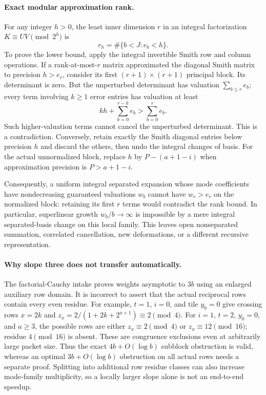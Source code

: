 \paragraph{Exact modular approximation rank.}
For any integer $h>0$, the least inner dimension $r$ in an integral
factorization $K\equiv UV\pmod {2^h}$ is
\[
 r_h=\#\{b<J:e_b<h\}.
\]
To prove the lower bound, apply the integral invertible Smith row
and column operations. If a rank-at-most-$r$ matrix approximated the
diagonal Smith matrix to precision $h>e_r$, consider its first
$(r+1)\times(r+1)$ principal block. Its determinant is zero. But the
unperturbed determinant has valuation $\sum_{b\le r}e_b$; every
term involving $k\ge1$ error entries has valuation at least
\[
 kh+\sum_{b=0}^{r-k}e_b
 >\sum_{b=0}^{r}e_b.
\]
Such higher-valuation terms cannot cancel the unperturbed determinant.
This is a contradiction. Conversely, retain exactly the Smith diagonal
entries below precision $h$ and discard the others, then undo the
integral changes of basis.
For the actual unnormalized block, replace $h$ by $P-(a+1-i)$
when approximation precision is $P>a+1-i$.

Consequently, a uniform integral separated expansion whose mode
coefficients have nondecreasing guaranteed valuations $w_b$ cannot
have $w_r>e_r$ on the normalized block: retaining its first $r$ terms
would contradict the rank bound. In particular, superlinear growth
$w_b/b\to\infty$ is impossible by a mere integral separated-basis
change on this local family. This leaves open nonseparated summation,
correlated cancellation, new deformations, or a different recursive
representation.

\paragraph{Why slope three does not transfer automatically.}
The factorial-Cauchy intake proves weights asymptotic to $3b$ using
an enlarged auxiliary row domain. It is incorrect to assert that the
actual reciprocal rows contain every even residue. For example,
$t=1$, $i=0$, and tile $y_0=0$ give crossing rows $x=2k$ and
$z_x=2/(1+2k+2^{a+1})\equiv2\pmod4$. For $i=1$, $t=2$, $y_0=0$,
and $a\ge3$, the possible rows are either $z_x\equiv2\pmod4$ or
$z_x\equiv12\pmod{16}$; residue $4\pmod{16}$ is absent.
These are congruence exclusions even at arbitrarily large packet size.
Thus the exact $4b+O(\log b)$ subblock obstruction is valid, whereas
an optimal $3b+O(\log b)$ obstruction on all actual rows needs a
separate proof. Splitting into additional row residue classes can also
increase mode-family multiplicity, so a locally larger slope alone
is not an end-to-end speedup.
